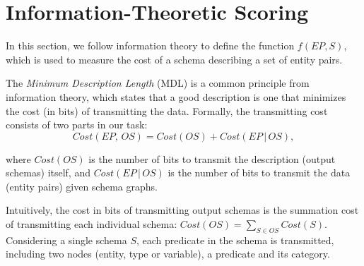 \section{Information-Theoretic Scoring}
\label{sec:scoring}

In this section, we follow information theory to define the function
$f(EP, S)$, which is used to measure the cost of a schema describing
a set of entity pairs.

The \textit{Minimum Description Length} (MDL) is a common principle from information theory,
which states that a good description is one that minimizes the cost (in bits) of transmitting
the data.
Formally, the transmitting cost consists of two parts in our task:
\begin{equation}
    \label{eqn:mdl}
    Cost(EP,\, OS) = Cost(OS) + Cost(EP\, |\, OS),
\end{equation}

\noindent
where $Cost(OS)$ is the number of bits to transmit the description (output schemas) itself, and
$Cost(EP\, |\, OS)$ is the number of bits to transmit the data (entity pairs) given schema graphs.


Intuitively, the cost in bits of transmitting output schemas is the summation cost
of transmitting each individual schema: $Cost(OS) = \sum\nolimits_{S \in OS} Cost(S)$.
Considering a single schema $S$, each predicate in the schema is transmitted, including
two nodes (entity, type or variable), a predicate and its category.

